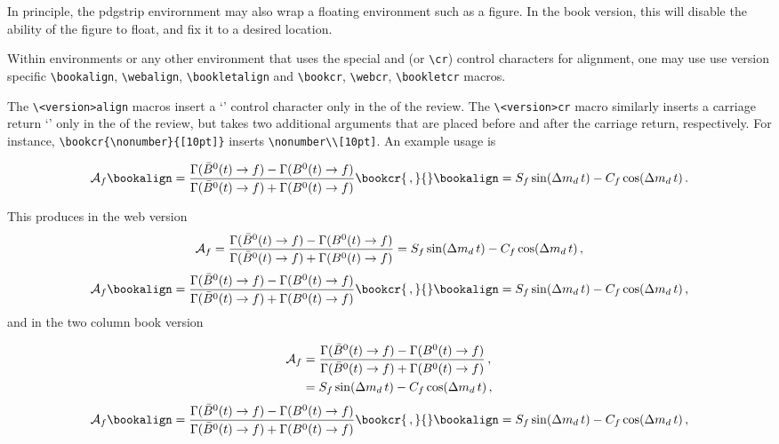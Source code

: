 In principle, the pdgstrip envirornment may also wrap a floating environment such as a figure. 
In the book version, this will disable the ability of the figure to float, and fix it to a desired location.

\label{sec:align}
Within  environments or any other environment that uses the special \invt{&} and \invt{\\\\} (or \lstinline{\cr}) control characters for alignment, one may use
use version specific \lstinline!\bookalign!, \lstinline!\webalign!, \lstinline!\bookletalign! and \lstinline!\bookcr!, \lstinline!\webcr!, \lstinline!\bookletcr! macros.

The \lstinline!\<version>align! macros insert a `\invt{&}' control character only in the  of the review. 
The \lstinline!\<version>cr! macro similarly inserts a carriage return `\invt{\\\\}' only in the  of the review, 
but takes two additional arguments that are placed before and after the carriage return, respectively. For instance,
\lstinline!\bookcr{\nonumber}{[10pt]}! inserts \lstinline!\nonumber\\[10pt]!.  An example usage is
\begin{verbtex}
\begin{align}
	{\cal A}_f 
	\bookalign = \frac{\Gamma(\bar{B}^0(t) \to f) - \Gamma(B^0(t) \to f)}
		{\Gamma(\bar{B}^0(t) \to f) + \Gamma(B^0(t) \to f)} \bookcr{\,,\nonumber}{}
	\bookalign = S_f \sin(\Delta m_d\, t) - C_f \cos(\Delta m_d\, t) \,.
\end{align}
\end{verbtex}
This produces in the web version
\ifrppbook
\onecolumn
	\begin{align}
		{\cal A}_f  = \frac{ \Gamma(\bar{B}^0(t) \to f) - \Gamma(B^0(t) \to  f) }
			{ \Gamma(\bar{B}^0(t) \to f) + \Gamma(B^0(t) \to  f) } 
			= S_f \sin(\Delta m_d\, t) - C_f \cos(\Delta m_d\, t) \,,
	\end{align}
\twocolumn
\else
	\begin{align}
		{\cal A}_f 
		\bookalign = \frac{ \Gamma(\bar{B}^0(t) \to f) - \Gamma(B^0(t) \to  f) }
			{ \Gamma(\bar{B}^0(t) \to f) + \Gamma(B^0(t) \to  f) } \bookcr{\,,\nonumber}{}
		\bookalign = S_f \sin(\Delta m_d\, t) - C_f \cos(\Delta m_d\, t) \,,
	\end{align}
\fi	
and in the two column book version
\addtocounter{equation}{-1}
\ifrppweb
	\twocolumn
	\begin{align}
		{\cal A}_f 
		& = \frac{ \Gamma(\bar{B}^0(t) \to f) - \Gamma(B^0(t) \to  f) }
			{ \Gamma(\bar{B}^0(t) \to f) + \Gamma(B^0(t) \to  f) } \,,\nonumber\\
		& = S_f \sin(\Delta m_d\, t) - C_f \cos(\Delta m_d\, t) \,,
	\end{align}
	\onecolumn
\else
	\begin{align}
		{\cal A}_f 
		\bookalign = \frac{ \Gamma(\bar{B}^0(t) \to f) - \Gamma(B^0(t) \to  f) }
			{ \Gamma(\bar{B}^0(t) \to f) + \Gamma(B^0(t) \to  f) } \bookcr{\,,\nonumber}{}
		\bookalign = S_f \sin(\Delta m_d\, t) - C_f \cos(\Delta m_d\, t) \,,
	\end{align}
\fi

